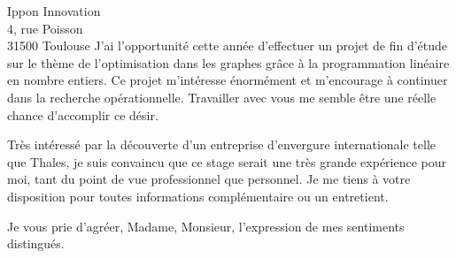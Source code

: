 \documentclass[12pt]{lettre}
\begin{document}
\begin{letter}{Ippon Innovation\\
4, rue Poisson\\
31500 Toulouse
}
J'ai l'opportunité cette année d'effectuer un projet de fin d'étude sur le thème de l'optimisation dans les graphes grâce à la programmation linéaire en nombre entiers. Ce projet m'intéresse énormément et m'encourage à continuer dans la recherche opérationnelle. Travailler avec vous me semble être une réelle chance d'accomplir ce désir.

Très intéressé par la découverte d'un entreprise d'envergure internationale telle que Thales, je suis convaincu que ce stage serait une très grande expérience pour moi, tant du point de vue professionnel que personnel. Je me tiens à votre disposition pour toutes informations complémentaire ou un entretient.
\closing{Je vous prie d'agréer, Madame, Monsieur, l'expression de mes sentiments distingués.}
\end{letter}
 
\end{document}
